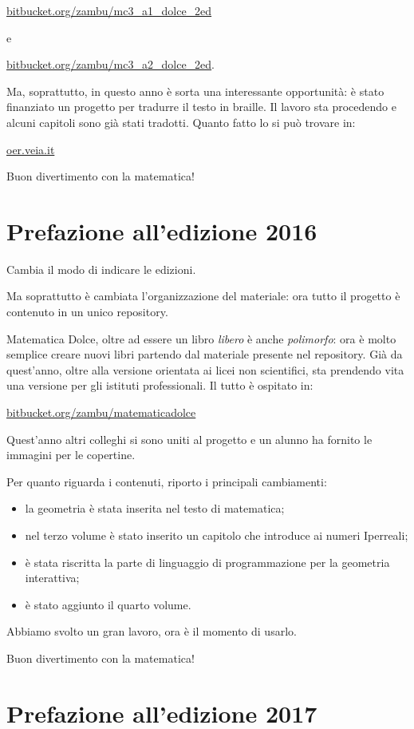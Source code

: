 \url{bitbucket.org/zambu/mc3_a1_dolce_2ed}

e 

\url{bitbucket.org/zambu/mc3_a2_dolce_2ed}. 


Ma, soprattutto, in questo anno è sorta una interessante opportunità: 
è stato finanziato un progetto per tradurre il testo in braille. 
Il lavoro sta procedendo e alcuni capitoli sono già stati tradotti. 
Quanto fatto lo si può trovare in:

\url{oer.veia.it}

Buon divertimento con la matematica!

\section{Prefazione all'edizione 2016}

Cambia il modo di indicare le edizioni. 

Ma soprattutto è cambiata l'organizzazione del materiale: ora tutto il 
progetto è contenuto in un unico repository.

Matematica Dolce, oltre ad essere un libro \emph{libero} è anche 
\emph{polimorfo}: ora è molto semplice creare nuovi libri partendo dal 
materiale presente nel repository. Già da quest'anno, oltre alla versione 
orientata ai licei non scientifici, sta prendendo vita una versione per gli 
istituti professionali.
Il tutto è ospitato in:

\url{bitbucket.org/zambu/matematicadolce}

Quest'anno altri colleghi si sono uniti al progetto e un alunno ha fornito le 
immagini per le copertine.

Per quanto riguarda i contenuti, riporto i principali cambiamenti:
\begin{itemize} [nosep]
 \item la geometria è stata inserita nel testo di matematica;
 \item nel terzo volume è stato inserito un capitolo che introduce ai numeri 
Iperreali;
 \item è stata riscritta la parte di linguaggio di programmazione per la 
geometria interattiva;
 \item è stato aggiunto il quarto volume.
\end{itemize}

Abbiamo svolto un gran lavoro, ora è il momento di usarlo.

Buon divertimento con la matematica!

\section{Prefazione all'edizione 2017}

